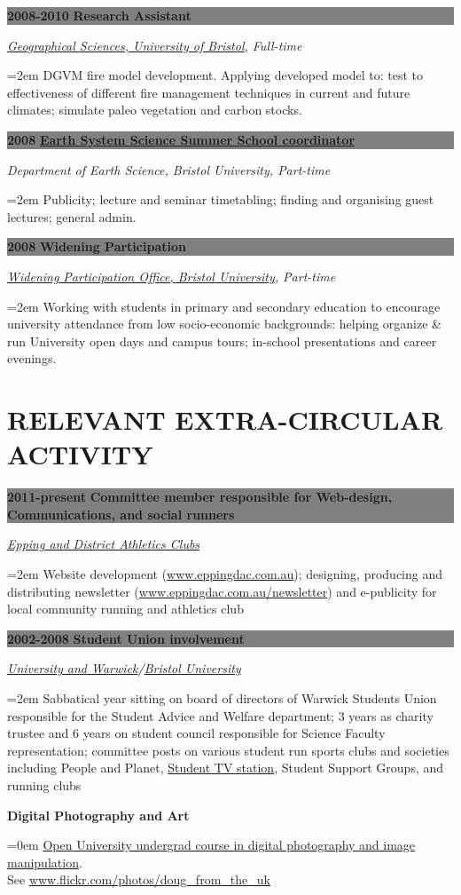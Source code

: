 \documentclass[paper=a4,fontsize=11pt]{scrartcl}	 			%
\newcommand{\sepspace}{\vspace*{0em}}			%
\newcommand{\NewPart}[1]{\vspace*{-0.5em} \section*{\uppercase{#1}} \vspace*{-0.75em} }
\newcommand{\EducationEntry}[4]{ \vspace*{0.7em}
		\noindent \colorbox{gray}{%
			\parbox{46em}{%
			\color{Black}\textbf{#2} \hspace{0.5cm} \textbf{#1}}} 				%
		\vspace*{-1em}
		\hfill 	\par				%
		\noindent \textit{#3} \par					%
		\noindent\hangindent=2em\hangafter=0 \small #4 	%
		\normalsize \par}
\newcommand{\BibEntry}[2]{
		\vspace*{-1em} \noindent \textbf{#1} \hfill \par					%
		\hangindent=0em\hangafter=0 \small #2} 	%
\begin{document}
\EducationEntry{Research  Assistant}{2008-2010}{\href{http://www.bristol.ac.uk/geography/} {Geographical Sciences, University of Bristol}, Full-time}
  {DGVM fire model development. Applying developed model to: test to effectiveness of different fire management techniques in current and future climates; simulate paleo vegetation and carbon stocks.}
\sepspace
\pagebreak
\EducationEntry{\href{http://www.greencycles.org/greencycles1/ES4\%20flyer\_2008.pdf}{Earth System Science Summer School coordinator}}{2008}{Department of Earth Science, Bristol University, Part-time}{Publicity; lecture and seminar timetabling; finding and organising guest lectures; general admin.}
\sepspace 
%

\EducationEntry{Widening Participation}{2008}{\href{http://www.bristol.ac.uk/sraa/wpur-office/}{Widening Participation Office, Bristol University}, Part-time}{Working with students in primary and secondary education to encourage university attendance from low socio-economic backgrounds: helping organize \& run University open days and campus tours; in-school presentations and career evenings.}

\NewPart{Relevant Extra-Circular activity}{}
\EducationEntry{Committee member responsible for Web-design,\\ Communications, and social runners}{2011-present}{\href{http://www.eppingdac.com.au/}{\newline Epping and District Athletics Clubs}}
  {Website development (\href{http://www.eppingdac.com.au/}{www.eppingdac.com.au}); designing, producing and distributing newsletter  (\href{http://www.eppingdac.com.au/newsletter}{www.eppingdac.com.au/newsletter}) and e-publicity for local community running and athletics club}
\sepspace  

\EducationEntry{Student Union involvement}{2002-2008}{\href{http://www.warwicksu.com/}{University and Warwick}/\href{http://www.ubu.org.uk/}{Bristol University}}
  {Sabbatical year sitting on board of directors of Warwick Students Union responsible for the Student Advice and Welfare department; 3 years as charity trustee and 6 years on student council responsible for Science Faculty representation; committee posts on various student run sports clubs and societies including People and Planet, \href{http://tv.warwick.ac.uk/}{Student TV station}, Student Support Groups, and running clubs \newline \newline}
 

\BibEntry{Digital Photography and Art}{\href{http://www3.open.ac.uk/study/undergraduate/course/t189.htm}{Open University undergrad course in digital photography and image manipulation}. \\ See \href{http://www.flickr.com/photos/doug\_from\_the\_uk/}{www.flickr.com/photos/doug\_from\_the\_uk}}




%
%
\end{document}
